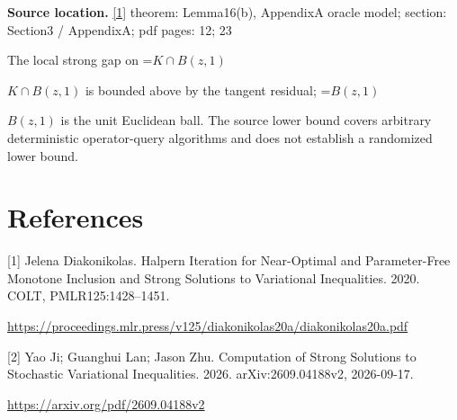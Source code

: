 \documentclass[10pt,a4paper]{article}
\newcommand{\AtlasMath}[1]{\par\begingroup\centering\setbox0=\hbox{$\displaystyle #1$}\ifdim\wd0>1.4\linewidth\typeout{ATLAS WIDE FORMULA: \the\wd0}\fi\ifdim\wd0>\linewidth\resizebox{\linewidth}{!}{\box0}\else\box0\fi\par\endgroup}
\newcommand{\AtlasInlineMath}[1]{\begingroup\setbox0=\hbox{$#1$}\ifdim\wd0>.4\linewidth\endgroup\AtlasMath{#1}\else\endgroup$#1$\fi}
\begin{document}
\textbf{Source location.} \href{https://proceedings.mlr.press/v125/diakonikolas20a/diakonikolas20a.pdf}{[1]} theorem: Lemma16(b), AppendixA oracle model; section: Section3 / AppendixA; pdf pages: 12; 23

The local strong gap on \AtlasInlineMath{K\cap B(z,1)} is bounded above by the tangent residual; \AtlasInlineMath{B(z,1)} is the unit Euclidean ball. The source lower bound covers arbitrary deterministic operator-query algorithms and does not establish a randomized lower bound.

\section{References}
[1] Jelena Diakonikolas. Halpern Iteration for Near-Optimal and Parameter-Free Monotone Inclusion and Strong Solutions to Variational Inequalities. 2020. COLT, PMLR125:1428--1451.

\url{https://proceedings.mlr.press/v125/diakonikolas20a/diakonikolas20a.pdf}

[2] Yao Ji; Guanghui Lan; Jason Zhu. Computation of Strong Solutions to Stochastic Variational Inequalities. 2026. arXiv:2609.04188v2, 2026-09-17.

\url{https://arxiv.org/pdf/2609.04188v2}
\end{document}
